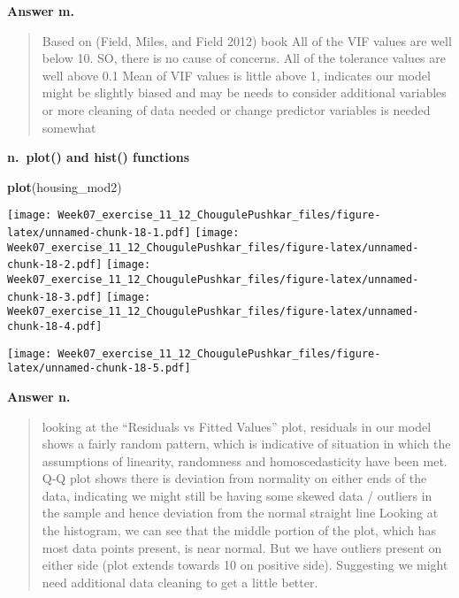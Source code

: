 \documentclass[
]{article}
\newenvironment{Shaded}{\begin{snugshade}}{\end{snugshade}}
\newcommand{\KeywordTok}[1]{\textcolor[rgb]{0.13,0.29,0.53}{\textbf{#1}}}
\newcommand{\NormalTok}[1]{#1}
\newcommand{\OperatorTok}[1]{\textcolor[rgb]{0.81,0.36,0.00}{\textbf{#1}}}
\begin{document}
\textbf{Answer m.}

\begin{quote}
Based on (Field, Miles, and Field 2012) book All of the VIF values are
well below 10. SO, there is no cause of concerns. All of the tolerance
values are well above 0.1 Mean of VIF values is little above 1,
indicates our model might be slightly biased and may be needs to
consider additional variables or more cleaning of data needed or change
predictor variables is needed somewhat
\end{quote}

\textbf{n.~plot() and hist() functions }

\begin{Shaded}
\begin{Highlighting}[]
\KeywordTok{plot}\NormalTok{(housing_mod2)}
\end{Highlighting}
\end{Shaded}

\texttt{[image: Week07\_exercise\_11\_12\_ChougulePushkar\_files/figure-latex/unnamed-chunk-18-1.pdf]}
\texttt{[image: Week07\_exercise\_11\_12\_ChougulePushkar\_files/figure-latex/unnamed-chunk-18-2.pdf]}
\texttt{[image: Week07\_exercise\_11\_12\_ChougulePushkar\_files/figure-latex/unnamed-chunk-18-3.pdf]}
\texttt{[image: Week07\_exercise\_11\_12\_ChougulePushkar\_files/figure-latex/unnamed-chunk-18-4.pdf]}

\begin{Shaded}
\end{Shaded}

\texttt{[image: Week07\_exercise\_11\_12\_ChougulePushkar\_files/figure-latex/unnamed-chunk-18-5.pdf]}

\textbf{Answer n.}

\begin{quote}
looking at the ``Residuals vs Fitted Values'' plot, residuals in our
model shows a fairly random pattern, which is indicative of situation in
which the assumptions of linearity, randomness and homoscedasticity have
been met. Q-Q plot shows there is deviation from normality on either
ends of the data, indicating we might still be having some skewed data /
outliers in the sample and hence deviation from the normal straight line
Looking at the histogram, we can see that the middle portion of the
plot, which has most data points present, is near normal. But we have
outliers present on either side (plot extends towards 10 on positive
side). Suggesting we might need additional data cleaning to get a little
better.
\end{quote}
\end{document}
